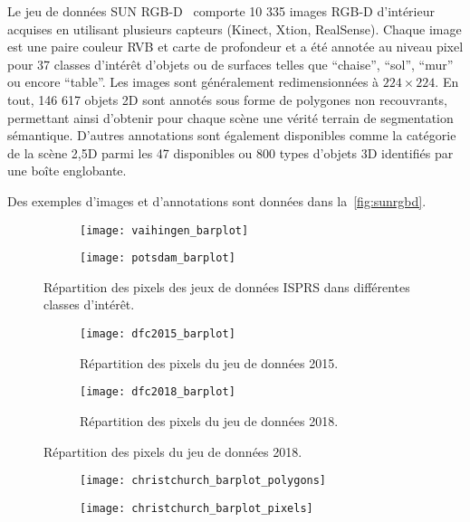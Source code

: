 Le jeu de données SUN RGB-D~\cite{song_sun_2015} comporte 10 335 images \glsdesc{RGB-D} d'intérieur acquises en utilisant plusieurs capteurs (Kinect, Xtion, RealSense). Chaque image est une paire couleur \gls{RVB} et carte de profondeur et a été annotée au niveau pixel pour 37 classes d'intérêt d'objets ou de surfaces telles que ``chaise'', ``sol'', ``mur'' ou encore ``table''. Les images sont généralement redimensionnées à $224\times224$. En tout, 146 617 objets 2D sont annotés sous forme de polygones non recouvrants, permettant ainsi d'obtenir pour chaque scène une vérité terrain de segmentation sémantique. D'autres annotations sont également disponibles comme la catégorie de la scène 2,5D parmi les 47 disponibles ou 800 types d'objets 3D identifiés par une boîte englobante.

Des exemples d'images  et d'annotations sont données dans la~\cref{fig:sunrgbd}.

\begin{figure}[h]
	\begin{subfigure}{0.5\textwidth}
		\texttt{[image: vaihingen\_barplot]}
	\end{subfigure}
	\begin{subfigure}{0.5\textwidth}
		\texttt{[image: potsdam\_barplot]}
	\end{subfigure}
	\caption{Répartition des pixels des jeux de données \gls{ISPRS} dans différentes classes d'intérêt.}
	\label{fig:isprs_barplots}
\end{figure}


\begin{figure}[h]
	\begin{subfigure}[t]{0.5\textwidth}
		\texttt{[image: dfc2015\_barplot]}
		\caption{Répartition des pixels du jeu de données  2015.}
		\label{fig:dfc2015_barplot}
	\end{subfigure}
	\begin{subfigure}[t]{0.5\textwidth}
		\texttt{[image: dfc2018\_barplot]}
		\caption{Répartition des pixels du jeu de données  2018.}
		\label{fig:dfc2018_barplot}
	\end{subfigure}
\end{figure}

\begin{figure}[h]
	\begin{subfigure}{0.5\textwidth}
		\texttt{[image: christchurch\_barplot\_polygons]}
	\end{subfigure}
	\begin{subfigure}{0.5\textwidth}
		\texttt{[image: christchurch\_barplot\_pixels]}
	\end{subfigure}
\end{figure}



